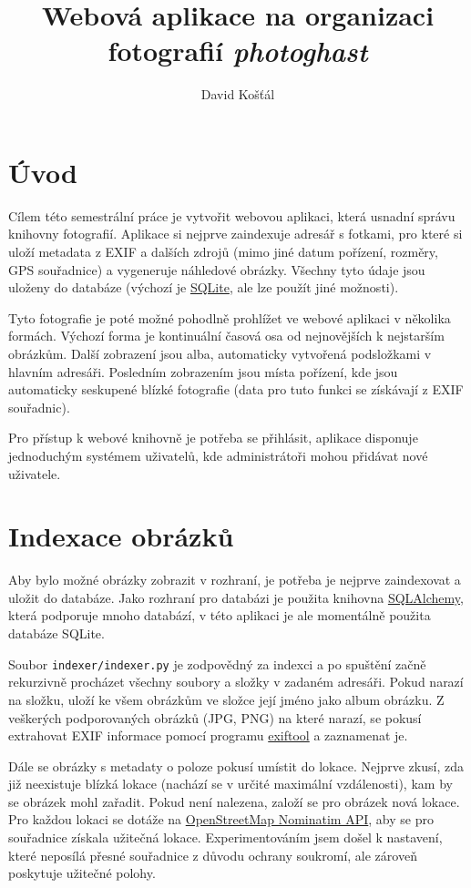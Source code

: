 \documentclass[czech]{template/pyt-report}
\title{Webová aplikace na organizaci fotografií \emph{photoghast}}
\author{David Košťál}
\affiliation{FIT ČVUT}
\begin{document}
\maketitle

\section{Úvod}
Cílem této semestrální práce je vytvořit webovou aplikaci, která usnadní správu
knihovny fotografií. Aplikace si nejprve zaindexuje adresář s fotkami, pro které
si uloží metadata z EXIF a dalších zdrojů (mimo jiné datum pořízení, rozměry,
GPS souřadnice) a vygeneruje náhledové obrázky. Všechny tyto údaje jsou uloženy do
databáze (výchozí je \href{https://www.sqlite.org/index.html}{SQLite},
ale lze použít jiné možnosti). 

Tyto fotografie je poté možné pohodlně prohlížet ve webové aplikaci v několika formách.
Výchozí forma je kontinuální časová osa od nejnovějších k nejstarším obrázkům.
Další zobrazení jsou alba, automaticky vytvořená podsložkami v hlavním adresáři.
Posledním zobrazením jsou místa pořízení, kde jsou automaticky seskupené blízké fotografie
(data pro tuto funkci se získávají z EXIF souřadnic).

Pro přístup k webové knihovně je potřeba se přihlásit, aplikace disponuje jednoduchým
systémem uživatelů, kde administrátoři mohou přidávat nové uživatele.
\section{Indexace obrázků}
Aby bylo možné obrázky zobrazit v rozhraní, je potřeba je nejprve zaindexovat
a uložit do databáze. Jako rozhraní pro databázi je použita knihovna 
\href{https://www.sqlalchemy.org}{SQLAlchemy}, která podporuje mnoho databází,
v této aplikaci je ale momentálně použita databáze SQLite.

Soubor \verb+indexer/indexer.py+ je zodpovědný za indexci a po spuštění začně
rekurzivně procházet všechny soubory a složky v zadaném adresáři. Pokud narazí
na složku, uloží ke všem obrázkům ve složce její jméno jako album obrázku.
Z veškerých podporovaných obrázků (JPG, PNG) na které narazí, se pokusí extrahovat
EXIF informace pomocí programu \href{https://exiftool.org/}{exiftool} a zaznamenat je.

Dále se obrázky s metadaty o poloze pokusí umístit do lokace. Nejprve zkusí, zda
již neexistuje blízká lokace (nachází se v určité maximální vzdálenosti),
kam by se obrázek mohl zařadit. Pokud není nalezena, založí se pro obrázek nová lokace.
Pro každou lokaci se dotáže na \href{https://nominatim.org/}{OpenStreetMap Nominatim API},
aby se pro souřadnice získala užitečná lokace. Experimentováním jsem došel k nastavení,
které neposílá přesné souřadnice z důvodu ochrany soukromí, ale zároveň poskytuje užitečné polohy.
\end{document}
